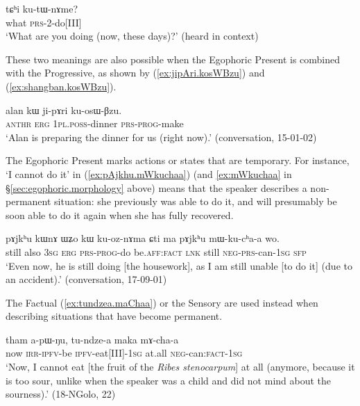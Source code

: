 \begin{exe}
\ex \label{ex:tChi.kutWnAme}
\gll tɕʰi ku-tɯ-nɤme? \\
what \textsc{prs}-2-do[III] \\
\glt `What are you doing (now, these days)?' (heard in context)
\end{exe}

These two meanings are also possible when the Egophoric Present is combined with the Progressive, as shown by (\ref{ex:jipAri.kosWBzu}) and (\ref{ex:shangban.kosWBzu}).

\begin{exe}
\ex \label{ex:jipAri.kosWBzu}
\gll alan kɯ ji-pɤri ku-osɯ-βzu. \\
\textsc{anthr} \textsc{erg} \textsc{1pl}.\textsc{poss}-dinner \textsc{prs}-\textsc{prog}-make \\
\glt `Alan is preparing the dinner for us (right now).' (conversation, 15-01-02)
\end{exe}

The Egophoric Present marks actions or states that are temporary. For instance,  `I cannot do it' in (\ref{ex:pAjkhu.mWkuchaa}) (and \ref{ex:mWkuchaa} in §\ref{sec:egophoric.morphology} above) means that the speaker describes a non-permanent situation: she previously was able to do it, and will presumably be soon able to do it again when she has fully recovered.

\begin{exe}
\ex \label{ex:pAjkhu.mWkuchaa}
\gll pɤjkʰu kɯnɤ ɯʑo kɯ ku-oz-nɤma ɕti ma pɤjkʰu mɯ-ku-cʰa-a wo. \\
still also \textsc{3sg} \textsc{erg} \textsc{prs}-\textsc{prog}-do be.\textsc{aff}:\textsc{fact} \textsc{lnk} still \textsc{neg}-\textsc{prs}-can-\textsc{1sg} \textsc{sfp} \\
\glt `Even now, he is still doing [the housework], as I am still unable [to do it] (due to an accident).' (conversation, 17-09-01)
\end{exe}

The Factual (\ref{ex:tundzea.maChaa}) or the Sensory are used instead when describing situations that have become permanent.

\begin{exe}
\ex \label{ex:tundzea.maChaa}
\gll  tham a-pɯ-ŋu, tu-ndze-a maka mɤ-cha-a \\
now \textsc{irr}-\textsc{ipfv}-be \textsc{ipfv}-eat[III]-\textsc{1sg} at.all \textsc{neg}-can:\textsc{fact}-\textsc{1sg} \\
\glt `Now, I cannot eat [the fruit of the \textit{Ribes stenocarpum}] at all (anymore, because it is too sour, unlike when the speaker was a child and did not mind about the sourness).' (18-NGolo, 22)
\end{exe}

